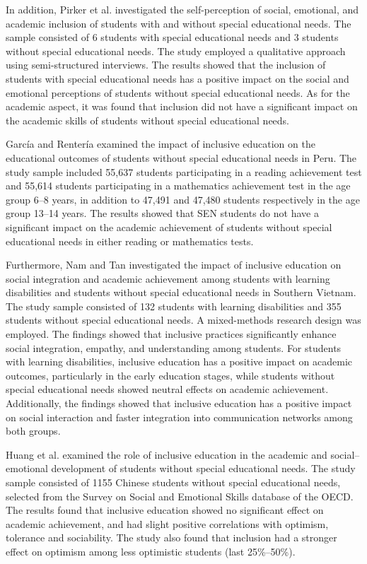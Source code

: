 \documentclass[10pt]{NSP1}
\begin{document}
	In addition, Pirker et al. \cite{ref28} investigated the self-perception of social, emotional, and academic inclusion of students with and without special educational needs. The sample consisted of 6 students with special educational needs and 3 students without special educational needs. The study employed a qualitative approach using semi-structured interviews. The results showed that the inclusion of students with special educational needs has a positive impact on the social and emotional perceptions of students without special educational needs. As for the academic aspect, it was found that inclusion did not have a significant impact on the academic skills of students without special educational needs.

	Garc\'{i}a and Renter\'{i}a \cite{ref13} examined the impact of inclusive education on the educational outcomes of students without special educational needs in Peru. The study sample included 55,637 students participating in a reading achievement test and 55,614 students participating in a mathematics achievement test in the age group 6--8 years, in addition to 47,491 and 47,480 students respectively in the age group 13--14 years. The results showed that SEN students do not have a significant impact on the academic achievement of students without special educational needs in either reading or mathematics tests.

	Furthermore, Nam and Tan \cite{ref23} investigated the impact of inclusive education on social integration and academic achievement among students with learning disabilities and students without special educational needs in Southern Vietnam. The study sample consisted of 132 students with learning disabilities and 355 students without special educational needs. A mixed-methods research design was employed. The findings showed that inclusive practices significantly enhance social integration, empathy, and understanding among students. For students with learning disabilities, inclusive education has a positive impact on academic outcomes, particularly in the early education stages, while students without special educational needs showed neutral effects on academic achievement. Additionally, the findings showed that inclusive education has a positive impact on social interaction and faster integration into communication networks among both groups.

	Huang et al. \cite{ref21} examined the role of inclusive education in the academic and social--emotional development of students without special educational needs. The study sample consisted of 1155 Chinese students without special educational needs, selected from the Survey on Social and Emotional Skills database of the OECD. The results found that inclusive education showed no significant effect on academic achievement, and had slight positive correlations with optimism, tolerance and sociability. The study also found that inclusion had a stronger effect on optimism among less optimistic students (last 25\%--50\%).
\end{document}
